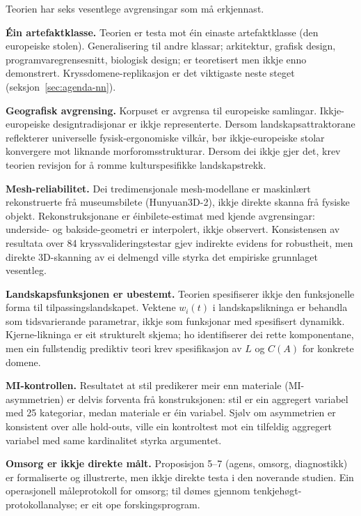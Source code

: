 Teorien har seks vesentlege avgrensingar som må erkjennast.

\textbf{Éin artefaktklasse.} Teorien er testa mot éin einaste artefaktklasse (den europeiske stolen). Generalisering til andre klassar; arkitektur, grafisk design, programvaregrensesnitt, biologisk design; er teoretisert men ikkje enno demonstrert. Kryssdomene-replikasjon er det viktigaste neste steget (seksjon~\ref{sec:agenda-nn}).

\textbf{Geografisk avgrensing.} Korpuset er avgrensa til europeiske samlingar. Ikkje-europeiske designtradisjonar er ikkje representerte. Dersom landskapsattraktorane reflekterer universelle fysisk-ergonomiske vilkår, bør ikkje-europeiske stolar konvergere mot liknande morforomsstrukturar. Dersom dei ikkje gjer det, krev teorien revisjon for å romme kulturspesifikke landskapstrekk.

\textbf{Mesh-reliabilitet.} Dei tredimensjonale mesh-modellane er maskinlært rekonstruerte frå museumsbilete (Hunyuan3D-2), ikkje direkte skanna frå fysiske objekt. Rekonstruksjonane er éinbilete-estimat med kjende avgrensingar: underside- og bakside-geometri er interpolert, ikkje observert. Konsistensen av resultata over 84 kryssvalideringstestar gjev indirekte evidens for robustheit, men direkte 3D-skanning av ei delmengd ville styrka det empiriske grunnlaget vesentleg.

\textbf{Landskapsfunksjonen er ubestemt.} Teorien spesifiserer ikkje den funksjonelle forma til tilpassingslandskapet. Vektene $w_i(t)$ i landskapslikninga er behandla som tidsvarierande parametrar, ikkje som funksjonar med spesifisert dynamikk. Kjerne-likninga er eit strukturelt skjema; ho identifiserer dei rette komponentane, men ein fullstendig prediktiv teori krev spesifikasjon av $L$ og $C(A)$ for konkrete domene.

\textbf{MI-kontrollen.} Resultatet at stil predikerer meir enn materiale (MI-asymmetrien) er delvis forventa frå konstruksjonen: stil er ein aggregert variabel med 25 kategoriar, medan materiale er éin variabel. Sjølv om asymmetrien er konsistent over alle hold-outs, ville ein kontroltest mot ein tilfeldig aggregert variabel med same kardinalitet styrka argumentet.

\textbf{Omsorg er ikkje direkte målt.} Proposisjon 5--7 (agens, omsorg, diagnostikk) er formaliserte og illustrerte, men ikkje direkte testa i den noverande studien. Ein operasjonell måleprotokoll for omsorg; til dømes gjennom tenkjehøgt-protokollanalyse; er eit ope forskingsprogram.


